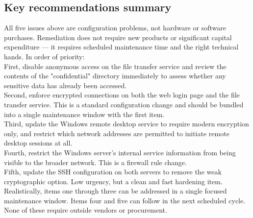 \documentclass[12pt]{article}
\begin{document}
\subsection{Key recommendations summary}
All five issues above are configuration problems, not hardware or software purchases. Remediation does not require new products or significant capital expenditure — it requires scheduled maintenance time and the right technical hands. In order of priority:\\
First, disable anonymous access on the file transfer service and review the contents of the "confidential" directory immediately to assess whether any sensitive data has already been accessed.\\
Second, enforce encrypted connections on both the web login page and the file transfer service. This is a standard configuration change and should be bundled into a single maintenance window with the first item.\\
Third, update the Windows remote desktop service to require modern encryption only, and restrict which network addresses are permitted to initiate remote desktop sessions at all.\\
Fourth, restrict the Windows server's internal service information from being visible to the broader network. This is a firewall rule change.\\
Fifth, update the SSH configuration on both servers to remove the weak cryptographic option. Low urgency, but a clean and fast hardening item.\\
Realistically, items one through three can be addressed in a single focused maintenance window. Items four and five can follow in the next scheduled cycle. None of these require outside vendors or procurement.\\
\end{document}
